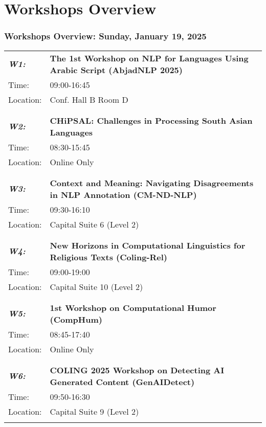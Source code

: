\chapter{Workshops Overview}
\subsection{Workshops Overview: Sunday, January 19, 2025}
\begin{longtable}{p{15mm}p{100mm}}
\emph{\textbf{W1:}} & \textbf{The 1st Workshop on NLP for Languages Using Arabic Script (AbjadNLP 2025)} \\
Time: & 09:00-16:45 \\
Location: & Conf. Hall B Room D \\\\
\hline\\
\emph{\textbf{W2:}} & \textbf{CHiPSAL: Challenges in Processing South Asian Languages} \\
Time: & 08:30-15:45 \\
Location: & Online Only \\\\
\hline\\
\emph{\textbf{W3:}} & \textbf{Context and Meaning: Navigating Disagreements in NLP Annotation (CM-ND-NLP)} \\
Time: & 09:30-16:10 \\
Location: & Capital Suite 6 (Level 2) \\\\
\hline\\
\emph{\textbf{W4:}} & \textbf{New Horizons in Computational Linguistics for Religious Texts (Coling-Rel)} \\
Time: & 09:00-19:00 \\
Location: & Capital Suite 10 (Level 2) \\\\
\hline\\
\emph{\textbf{W5:}} & \textbf{1st Workshop on Computational Humor (CompHum)} \\
Time: & 08:45-17:40 \\
Location: & Online Only \\\\
\hline\\
\emph{\textbf{W6:}} & \textbf{COLING 2025 Workshop on Detecting AI Generated Content (GenAIDetect)} \\
Time: & 09:50-16:30 \\
Location: & Capital Suite 9 (Level 2) \\\\

\end{longtable}
